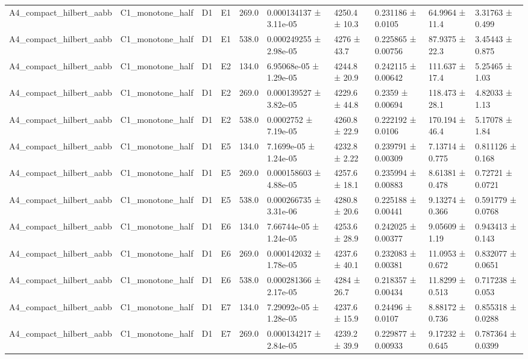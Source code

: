 \begin{table}
\begin{tabular}{llllllllll}
A4\_compact\_hilbert\_aabb & C1\_monotone\_half & D1 & E1 & 269.0 & 0.000134137 ± 3.11e-05 & 4250.4 ± 10.3 & 0.231186 ± 0.0105 & 64.9964 ± 11.4 & 3.31763 ± 0.499 \\
A4\_compact\_hilbert\_aabb & C1\_monotone\_half & D1 & E1 & 538.0 & 0.000249255 ± 2.98e-05 & 4276 ± 43.7 & 0.225865 ± 0.00756 & 87.9375 ± 22.3 & 3.45443 ± 0.875 \\
A4\_compact\_hilbert\_aabb & C1\_monotone\_half & D1 & E2 & 134.0 & 6.95068e-05 ± 1.29e-05 & 4244.8 ± 20.9 & 0.242115 ± 0.00642 & 111.637 ± 17.4 & 5.25465 ± 1.03 \\
A4\_compact\_hilbert\_aabb & C1\_monotone\_half & D1 & E2 & 269.0 & 0.000139527 ± 3.82e-05 & 4229.6 ± 44.8 & 0.2359 ± 0.00694 & 118.473 ± 28.1 & 4.82033 ± 1.13 \\
A4\_compact\_hilbert\_aabb & C1\_monotone\_half & D1 & E2 & 538.0 & 0.0002752 ± 7.19e-05 & 4260.8 ± 22.9 & 0.222192 ± 0.0106 & 170.194 ± 46.4 & 5.17078 ± 1.84 \\
A4\_compact\_hilbert\_aabb & C1\_monotone\_half & D1 & E5 & 134.0 & 7.1699e-05 ± 1.24e-05 & 4232.8 ± 2.22 & 0.239791 ± 0.00309 & 7.13714 ± 0.775 & 0.811126 ± 0.168 \\
A4\_compact\_hilbert\_aabb & C1\_monotone\_half & D1 & E5 & 269.0 & 0.000158603 ± 4.88e-05 & 4257.6 ± 18.1 & 0.235994 ± 0.00883 & 8.61381 ± 0.478 & 0.72721 ± 0.0721 \\
A4\_compact\_hilbert\_aabb & C1\_monotone\_half & D1 & E5 & 538.0 & 0.000266735 ± 3.31e-06 & 4280.8 ± 20.6 & 0.225188 ± 0.00441 & 9.13274 ± 0.366 & 0.591779 ± 0.0768 \\
A4\_compact\_hilbert\_aabb & C1\_monotone\_half & D1 & E6 & 134.0 & 7.66744e-05 ± 1.24e-05 & 4253.6 ± 28.9 & 0.242025 ± 0.00377 & 9.05609 ± 1.19 & 0.943413 ± 0.143 \\
A4\_compact\_hilbert\_aabb & C1\_monotone\_half & D1 & E6 & 269.0 & 0.000142032 ± 1.78e-05 & 4237.6 ± 40.1 & 0.232083 ± 0.00381 & 11.0953 ± 0.672 & 0.832077 ± 0.0651 \\
A4\_compact\_hilbert\_aabb & C1\_monotone\_half & D1 & E6 & 538.0 & 0.000281366 ± 2.17e-05 & 4284 ± 26.7 & 0.218357 ± 0.00434 & 11.8299 ± 0.513 & 0.717238 ± 0.053 \\
A4\_compact\_hilbert\_aabb & C1\_monotone\_half & D1 & E7 & 134.0 & 7.29092e-05 ± 1.28e-05 & 4237.6 ± 15.9 & 0.24496 ± 0.0107 & 8.88172 ± 0.736 & 0.855318 ± 0.0288 \\
A4\_compact\_hilbert\_aabb & C1\_monotone\_half & D1 & E7 & 269.0 & 0.000134217 ± 2.84e-05 & 4239.2 ± 39.9 & 0.229877 ± 0.00933 & 9.17232 ± 0.645 & 0.787364 ± 0.0399 \\

\end{tabular}
\end{table}
